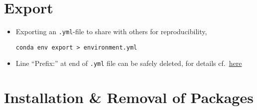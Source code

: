 \documentclass[12pt, a4paper]{scrbook}
\numberwithin{equation}{section}
\theoremstyle{definition}
\theoremstyle{definition}
\begin{document}
	\section{Export}
	
	\begin{itemize}
		\item Exporting an \texttt{.yml}-file to share with others for reproducibility,
		
		\begin{lstlisting}[style=mystylebash, label=alg:conda_export, xleftmargin=\parindent]
			conda env export > environment.yml
		\end{lstlisting}
		
		\item Line \enquote{Prefix:} at end of \texttt{.yml} file can be safely deleted, for details cf.~\href{https://stackoverflow.com/questions/39280638/how-to-share-conda-environments-across-platforms}{here}
	\end{itemize}
	
	\section{Installation \& Removal of Packages}
	
\end{document}
